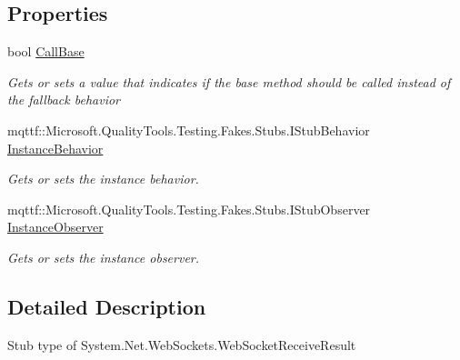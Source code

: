 \subsection*{Properties}
\begin{DoxyCompactItemize}
\item 
bool \hyperlink{class_system_1_1_net_1_1_web_sockets_1_1_fakes_1_1_stub_web_socket_receive_result_a596e61553353d274402e93e5938f7cf7}{Call\-Base}
\begin{DoxyCompactList}\small\item\em Gets or sets a value that indicates if the base method should be called instead of the fallback behavior\end{DoxyCompactList}\item 
mqttf\-::\-Microsoft.\-Quality\-Tools.\-Testing.\-Fakes.\-Stubs.\-I\-Stub\-Behavior \hyperlink{class_system_1_1_net_1_1_web_sockets_1_1_fakes_1_1_stub_web_socket_receive_result_a8483a5ff6ccaf14b18d84f24032d5ac4}{Instance\-Behavior}
\begin{DoxyCompactList}\small\item\em Gets or sets the instance behavior.\end{DoxyCompactList}\item 
mqttf\-::\-Microsoft.\-Quality\-Tools.\-Testing.\-Fakes.\-Stubs.\-I\-Stub\-Observer \hyperlink{class_system_1_1_net_1_1_web_sockets_1_1_fakes_1_1_stub_web_socket_receive_result_a3a5c27c89128ceef381ea92edc1bd81f}{Instance\-Observer}
\begin{DoxyCompactList}\small\item\em Gets or sets the instance observer.\end{DoxyCompactList}\end{DoxyCompactItemize}


\subsection{Detailed Description}
Stub type of System.\-Net.\-Web\-Sockets.\-Web\-Socket\-Receive\-Result



